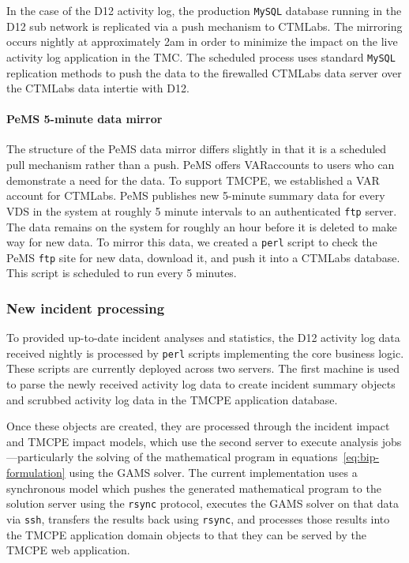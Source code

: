 \documentclass[12pt]{report}
\begin{document}
In the case of the \ac{D12} activity log, the production \texttt{MySQL} database
running in the \ac{D12} sub network is replicated via a push mechanism to
\ac{CTMLabs}.  The mirroring occurs nightly at approximately 2am in order to
minimize the impact on the live activity log application in the \ac{TMC}.  The
scheduled process uses standard \texttt{MySQL} replication methods to push the
data to the firewalled \ac{CTMLabs} data server over the \ac{CTMLabs} data
intertie with \ac{D12}.

\paragraph{PeMS 5-minute data mirror}

The structure of the \ac{PeMS} data mirror differs slightly in that it is a
scheduled pull mechanism rather than a push.  \ac{PeMS} offers \acf{VAR}accounts
to users who can demonstrate a need for the data.  To support \ac{TMCPE}, we
established a \ac{VAR} account for \ac{CTMLabs}.  \ac{PeMS} publishes new
5-minute summary data for every \ac{VDS} in the system at roughly 5 minute
intervals to an authenticated \texttt{ftp} server.  The data remains on the
system for roughly an hour before it is deleted to make way for new data.  To
mirror this data, we created a \texttt{perl} script to check the \ac{PeMS}
\texttt{ftp} site for new data, download it, and push it into a \ac{CTMLabs}
database.  This script is scheduled to run every 5 minutes.


\subsubsection{New incident processing}
\label{sec:incident-processing}

To provided up-to-date incident analyses and statistics, the \ac{D12} activity
log data received nightly is processed by \texttt{perl} scripts implementing the
core business logic.  These scripts are currently deployed across two servers.
The first machine is used to parse the newly received activity log data to
create incident summary objects and scrubbed activity log data in the \ac{TMCPE}
application database.  


Once these objects are created, they are processed through the incident impact
and \ac{TMCPE} impact models, which use the second server to execute analysis
jobs---particularly the solving of the mathematical program in
equations~\eqref{eq:bip-formulation} using the \ac{GAMS} solver.  The current
implementation uses a synchronous model which pushes the generated mathematical
program to the solution server using the \texttt{rsync} protocol, executes the
\ac{GAMS} solver on that data via \texttt{ssh}, transfers the results back using
\texttt{rsync}, and processes those results into the \ac{TMCPE} application
domain objects to that they can be served by the \ac{TMCPE} web application.
\end{document}
